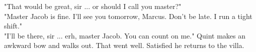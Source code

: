 "That would be great, sir ... or should I call you master?"\\

"Master Jacob is fine. I'll see you tomorrow, Marcus. Don't be late. I run a tight shift."\\

"I'll be there, sir ... erh, master Jacob. You can count on me." Quint makes an awkward bow and walks out. That went well. Satisfied he returns to the villa.\\

